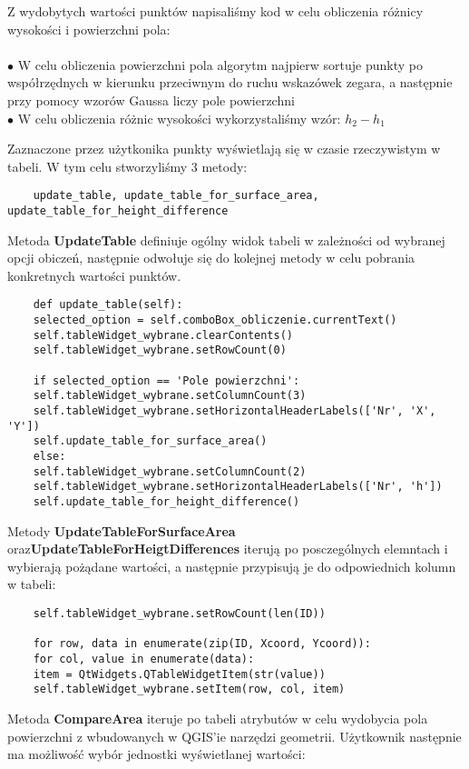 \documentclass[a4paper,titleauthor]{mwart}
\begin{document}
Z wydobytych wartości punktów napisaliśmy kod w celu obliczenia różnicy wysokości i powierzchni pola:\\ \\
$\bullet$ W celu obliczenia powierzchni pola algorytm najpierw sortuje punkty po współrzędnych w kierunku przeciwnym do ruchu wskazówek zegara, a następnie przy pomocy wzorów Gaussa liczy pole powierzchni\\
$\bullet$ W celu obliczenia różnic wysokości wykorzystaliśmy wzór: $h_{2} - h_{1}$

Zaznaczone przez użytkonika punkty wyświetlają się w czasie rzeczywistym w tabeli. W tym celu stworzyliśmy 3 metody: 
\begin{verbatim}
	update_table, update_table_for_surface_area, update_table_for_height_difference
\end{verbatim}
Metoda \textbf{UpdateTable} definiuje ogólny widok tabeli w zależności od wybranej opcji obiczeń, następnie odwołuje się do kolejnej metody w celu pobrania konkretnych wartości punktów.

\begin{verbatim}
	def update_table(self):
	selected_option = self.comboBox_obliczenie.currentText()
	self.tableWidget_wybrane.clearContents()
	self.tableWidget_wybrane.setRowCount(0)
	
	if selected_option == 'Pole powierzchni':
	self.tableWidget_wybrane.setColumnCount(3)
	self.tableWidget_wybrane.setHorizontalHeaderLabels(['Nr', 'X', 'Y'])
	self.update_table_for_surface_area()
	else:
	self.tableWidget_wybrane.setColumnCount(2)
	self.tableWidget_wybrane.setHorizontalHeaderLabels(['Nr', 'h'])
	self.update_table_for_height_difference()
\end{verbatim}

Metody \textbf{UpdateTableForSurfaceArea} oraz\textbf{UpdateTableForHeigtDifferences} iterują po posczególnych elemntach i wybierają pożądane wartości, a następnie przypisują je do odpowiednich kolumn w tabeli:

\begin{verbatim}
	self.tableWidget_wybrane.setRowCount(len(ID))
	
	for row, data in enumerate(zip(ID, Xcoord, Ycoord)):
	for col, value in enumerate(data):
	item = QtWidgets.QTableWidgetItem(str(value))
	self.tableWidget_wybrane.setItem(row, col, item)
\end{verbatim}
Metoda \textbf{CompareArea} iteruje po tabeli atrybutów w celu wydobycia pola powierzchni z wbudowanych w QGIS'ie narzędzi geometrii. Użytkownik następnie ma możliwość wybór jednostki wyświetlanej wartości:
\end{document}

